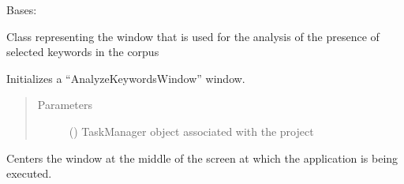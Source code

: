 \documentclass[letterpaper,10pt,english]{sphinxmanual}
\begin{document}
\begin{fulllineitems}
\label{\detokenize{gui_analyze_keywords_window:src.graphical_user_interface.analyze_keywords_window.AnalyzeKeywordsWindow}}
\sphinxAtStartPar
Bases: 

\sphinxAtStartPar
Class representing the window that is used for the analysis of the presence of
selected keywords in the corpus

\begin{fulllineitems}
\label{\detokenize{gui_analyze_keywords_window:src.graphical_user_interface.analyze_keywords_window.AnalyzeKeywordsWindow.__init__}}
\sphinxAtStartPar
Initializes a “AnalyzeKeywordsWindow” window.
\begin{quote}\begin{description}
\item[{Parameters}] \leavevmode
\sphinxAtStartPar
{} () \textendash{} TaskManager object associated with the project

\end{description}\end{quote}

\end{fulllineitems}


\begin{fulllineitems}
\label{\detokenize{gui_analyze_keywords_window:src.graphical_user_interface.analyze_keywords_window.AnalyzeKeywordsWindow.center}}
\sphinxAtStartPar
Centers the window at the middle of the screen at which the application is being executed.


\end{fulllineitems}
\end{fulllineitems}
\end{document}
